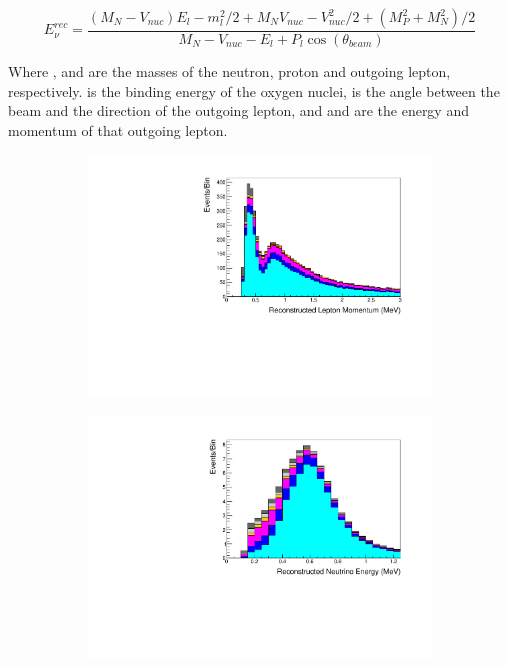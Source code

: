 \begin{equation}
  \label{sec:SelsAndSysts_Erec_CCQE}
  E^{rec}_{\nu} = \frac{(M_{N}-V_{nuc})E_{l} - m_{l}^{2}/2 + M_{N}V_{nuc} - V_{nuc}^{2}/2 + (M_{P}^{2} + M_{N}^{2})/2}{M_{N} - V_{nuc} - E_{l} + P_{l}\cos(\theta_{beam})}
\end{equation}

Where ,  and  are the masses of the neutron, proton and outgoing lepton, respectively.  is the binding energy of the oxygen nuclei,  is the angle between the beam and the direction of the outgoing lepton, and  and  are the energy and momentum of that outgoing lepton.

\begin{figure}[h]
  \begin{subfigure}[t]{0.49\textwidth}
    \includegraphics[width=\textwidth, trim={0mm 0mm 0mm 0mm}, clip,page=1]{Figures/Selections/FHC1Rmu-2020_X.pdf}
  \end{subfigure}%
  \begin{subfigure}[t]{0.49\textwidth}
    \includegraphics[width=\textwidth, trim={0mm 0mm 0mm 0mm}, clip,page=1]{Figures/Selections/FHC1Re-2020_X.pdf}

\end{subfigure}
\end{figure}
